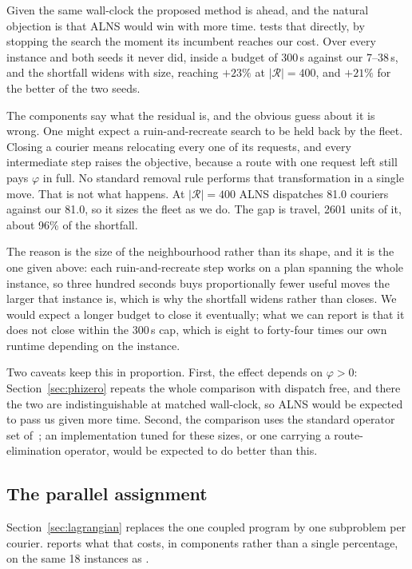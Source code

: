 Given the same wall-clock the proposed method is ahead, and the natural objection
is that ALNS would win with more time.  tests
that directly, by stopping the search the moment its incumbent reaches our
cost. Over every instance and both seeds it never did, inside a budget of
300\,s against our 7--38\,s, and the shortfall
widens with size, reaching $+23\%$ at
$|\mathcal{R}| = 400$, and $+21\%$ for the better of the two seeds.


The components say what the residual is, and the obvious guess about it is
wrong. One might expect a ruin-and-recreate search to be held
back by the fleet. Closing a courier means relocating every one of its requests,
and every intermediate step raises the objective, because a route with one
request left still pays $\varphi$ in full. No standard removal rule performs that
transformation in a single move. That is not what happens. At $|\mathcal{R}| = 400$ ALNS dispatches
81.0 couriers against our
81.0, so it sizes the fleet as we do. The gap is
travel, 2601 units of it, about
96\% of the shortfall.

The reason is the size of the neighbourhood rather than its shape, and it is the
one given above: each ruin-and-recreate step works on a plan spanning the whole
instance, so three hundred seconds buys proportionally fewer useful moves the
larger that instance is, which is why the shortfall widens rather than closes. We would expect a longer budget to close it eventually; what
we can report is that it does not close within the $300$\,s cap, which is eight
to forty-four times our own runtime depending on the instance.


Two caveats keep this in proportion. First, the effect depends on
$\varphi > 0$: Section~\ref{sec:phizero} repeats the whole comparison with
dispatch free, and there the two are indistinguishable at matched wall-clock, so
ALNS would be expected to pass us given more time. Second, the
comparison uses the standard operator set of~\citet{ropke2006adaptive}; an
implementation tuned for these sizes, or one carrying a route-elimination
operator, would be expected to do better than this.

\subsection{The parallel assignment}\label{sec:lagrangianresults}

Section~\ref{sec:lagrangian} replaces the one coupled program by one
subproblem per courier.  reports what that costs, in
components rather than a single percentage, on the same 18 instances as
.

